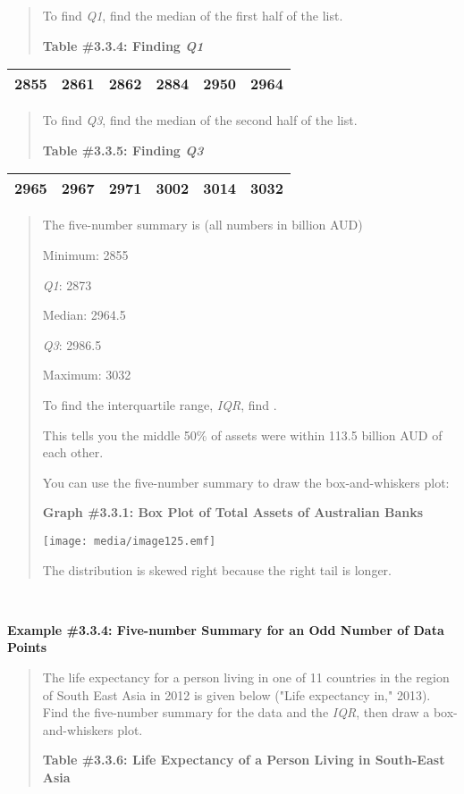\documentclass[]{book}
\begin{document}
\begin{quote}
To find \emph{Q1}, find the median of the first half of the list.

\textbf{Table \#3.3.4: Finding \emph{Q1}}
\end{quote}

\begin{longtable}[]{@{}llllll@{}}
\toprule
\endhead
2855 & 2861 & 2862 & 2884 & 2950 & 2964\tabularnewline
\bottomrule
\end{longtable}

\begin{quote}
To find \emph{Q3}, find the median of the second half of the list.

\textbf{Table \#3.3.5: Finding \emph{Q3}}
\end{quote}

\begin{longtable}[]{@{}llllll@{}}
\toprule
\endhead
2965 & 2967 & 2971 & 3002 & 3014 & 3032\tabularnewline
\bottomrule
\end{longtable}

\begin{quote}
The five-number summary is (all numbers in billion AUD)

Minimum: 2855

\emph{Q1}: 2873

Median: 2964.5

\emph{Q3}: 2986.5

Maximum: 3032

To find the interquartile range, \emph{IQR}, find .

This tells you the middle 50\% of assets were within 113.5 billion AUD
of each other.

You can use the five-number summary to draw the box-and-whiskers plot:

\textbf{Graph \#3.3.1: Box Plot of Total Assets of Australian Banks}

\texttt{[image: media/image125.emf]}

The distribution is skewed right because the right tail is longer.
\end{quote}

\textbf{\\
}

\textbf{Example \#3.3.4: Five-number Summary for an Odd Number of Data Points
}

\begin{quote}
The life expectancy for a person living in one of 11 countries in the
region of South East Asia in 2012 is given below ("Life expectancy
in," 2013). Find the five-number summary for the data and the \emph{IQR},
then draw a box-and-whiskers plot.

\textbf{Table \#3.3.6: Life Expectancy of a Person Living in South-East
Asia}
\end{quote}
\end{document}
